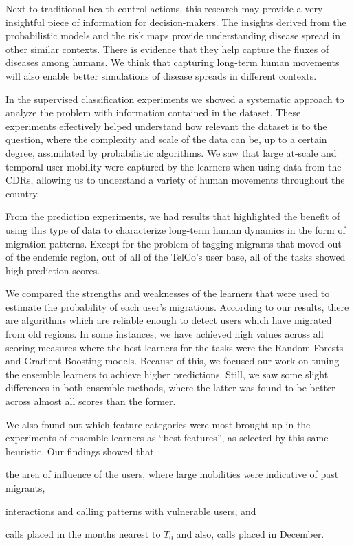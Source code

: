 Next to traditional health control actions, this research may provide a very insightful piece of information for decision-makers.
The insights derived from the probabilistic models and the risk maps provide understanding disease spread in other similar contexts.
There is evidence that they help capture the fluxes of diseases among humans.
We think that capturing long-term human movements will also enable better simulations of disease spreads in different contexts.


In the supervised classification experiments we showed a systematic approach to analyze the problem with information contained in the dataset.
These experiments effectively helped understand how relevant the dataset is to the question, where the complexity and scale of the data can be, up to a certain degree, assimilated by probabilistic algorithms.
We saw that large at-scale and temporal user mobility were captured by the learners when using data from the CDRs, allowing us to understand a variety of human movements throughout the country.


From the prediction experiments, we had results that highlighted the benefit of using this type of data to characterize long-term human dynamics in the form of migration patterns.
Except for the problem of tagging migrants that moved out of the endemic region, out of all of the TelCo's user base, all of the tasks showed high prediction scores.

We compared the strengths and weaknesses of the learners that  were used to estimate the probability of each user's migrations.
According to our results, there are algorithms which are reliable enough to detect users which have migrated from old regions.
In some instances, we have achieved high values across all scoring measures where the best learners for the tasks were the Random Forests and Gradient Boosting models.
Because of this, we focused our work on tuning the ensemble learners to achieve higher predictions.
Still, we saw some slight differences in both ensemble methods, where the latter was found to be better across almost all scores than the former.

We also found out which feature categories were most brought up in the experiments of ensemble learners as ``best-features'', as selected by this same heuristic. 
Our findings showed that
\begin{enumerate*}[label={\alph*)},]
\item the area of influence of the users, where large mobilities were indicative of past migrants, 
\item interactions and calling patterns with vulnerable users, and
\item calls placed in the months nearest to $T_0$ and also, calls placed in December.
\end{enumerate*}

